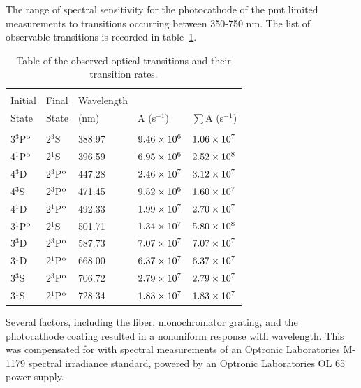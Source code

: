 The range of spectral sensitivity for the photocathode of the \acs{pmt} limited
measurements to transitions occurring between 350-750 nm. The list of observable
transitions is recorded in table~\ref{tbl:transitions}.
\begin{table}
  \centering
  \caption{Table of the observed optical transitions and their transition
    rates.}
  \begin{tabular}{lllll}
    \toprule                                                                    \\
    Initial      & Final        & Wavelength &              &                   \\
    State        & State        & (nm)       & A (s$^{-1}$) & $\sum$A (s$^{-1}$)\\
    \midrule                                                                    \\
    3$^3$P$^\mathrm{o}$ & 2$^3$S       & 388.97     & $9.46\times10^6$   & $1.06\times10^7$        \\
    4$^1$P$^\mathrm{o}$ & 2$^1$S       & 396.59     & $6.95\times10^6$   & $2.52\times10^8$        \\
    4$^3$D       & 2$^3$P$^\mathrm{o}$ & 447.28     & $2.46\times10^7$   & $3.12\times10^7$        \\
    4$^3$S       & 2$^3$P$^\mathrm{o}$ & 471.45     & $9.52\times10^6$   & $1.60\times10^7$        \\
    4$^1$D       & 2$^1$P$^\mathrm{o}$ & 492.33     & $1.99\times10^7$   & $2.70\times10^7$        \\
    3$^1$P$^\mathrm{o}$ & 2$^1$S       & 501.71     & $1.34\times10^7$   & $5.80\times10^8$        \\
    3$^3$D       & 2$^3$P$^\mathrm{o}$ & 587.73     & $7.07\times10^7$   & $7.07\times10^7$        \\
    3$^1$D       & 2$^1$P$^\mathrm{o}$ & 668.00     & $6.37\times10^7$   & $6.37\times10^7$        \\
    3$^3$S       & 2$^3$P$^\mathrm{o}$ & 706.72     & $2.79\times10^7$   & $2.79\times10^7$        \\
    3$^1$S       & 2$^1$P$^\mathrm{o}$ & 728.34     & $1.83\times10^7$   & $1.83\times10^7$        \\
  \end{tabular}
  \label{tbl:transitions}
\end{table}
Several factors, including the fiber, monochromator grating, and the
photocathode coating resulted in a nonuniform response with wavelength. This was
compensated for with spectral measurements of an Optronic Laboratories M-1179
spectral irradiance standard, powered by an Optronic Laboratories OL 65 power
supply. 

